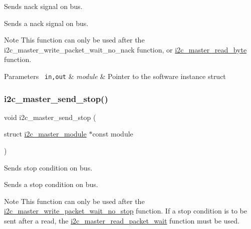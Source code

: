 Sends nack signal on bus. 

Sends a nack signal on bus.

\begin{DoxyNote}{Note}
This function can only be used after the i2c\+\_\+master\+\_\+write\+\_\+packet\+\_\+wait\+\_\+no\+\_\+nack function, or \mbox{\hyperlink{group__asfdoc__sam0__sercom__i2c__group_ga54cf79ca8aa80e2163881ca4164e35f7}{i2c\+\_\+master\+\_\+read\+\_\+byte}} function. 
\end{DoxyNote}

\begin{DoxyParams}[1]{Parameters}
\mbox{\texttt{ in,out}}  & {\em module} & Pointer to the software instance struct \\
\hline
\end{DoxyParams}
\mbox{\label{group__asfdoc__sam0__sercom__i2c__group_ga6bddf9e717847b5fa8462596e7e1489c}} 
\subsubsection{\texorpdfstring{i2c\_master\_send\_stop()}{i2c\_master\_send\_stop()}}
{\footnotesize\ttfamily void i2c\+\_\+master\+\_\+send\+\_\+stop (\begin{DoxyParamCaption}\item[{struct \mbox{\hyperlink{structi2c__master__module}{i2c\+\_\+master\+\_\+module}} $\ast$const}]{module }\end{DoxyParamCaption})}



Sends stop condition on bus. 

Sends a stop condition on bus.

\begin{DoxyNote}{Note}
This function can only be used after the \mbox{\hyperlink{group__asfdoc__sam0__sercom__i2c__group_ga4d874599c2bff10cd08f5474041c66bb}{i2c\+\_\+master\+\_\+write\+\_\+packet\+\_\+wait\+\_\+no\+\_\+stop}} function. If a stop condition is to be sent after a read, the \mbox{\hyperlink{group__asfdoc__sam0__sercom__i2c__group_ga238a755f972b9c3287131cda5fc25725}{i2c\+\_\+master\+\_\+read\+\_\+packet\+\_\+wait}} function must be used.
\end{DoxyNote}

